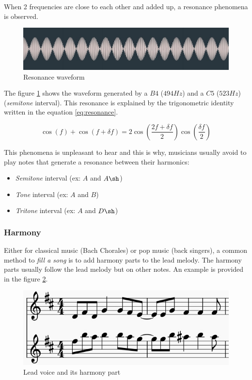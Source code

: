\documentclass[12pt]{report}
\begin{document}
When 2 frequencies are close to each other and added up, a resonance phenomena is observed.

\begin{figure}[H]
    \centering
    \includegraphics[width=\textwidth]{images/music/waveform/resonance.jpg}
    \caption{Resonance waveform}
    \label{fig:resonance}
\end{figure}
The figure \ref{fig:resonance} shows the waveform generated by a $B4$ ($494Hz$) and a $C5$ ($523Hz$) (\textit{semitone} interval).
This resonance is explained by the trigonometric identity written in the equation \ref{eq:resonance}.

\begin{equation}
    \cos(f) + \cos(f + \delta f) = 2 \cos(\frac{2f + \delta f}{2}) \cos(\frac{\delta f}{2})
    \label{eq:resonance}
\end{equation}

This phenomena is unpleasant to hear and this is why, musicians usually avoid to play notes that generate a resonance between their harmonics:
\begin{itemize}
    \item \textit{Semitone} interval (ex: $A$ and $A\sh$)
    \item \textit{Tone} interval (ex: $A$ and $B$)
    \item \textit{Tritone} interval (ex: $A$ and $D\sh$)
\end{itemize}


\subsubsection{Harmony}

Either for classical music (Bach Chorales) or pop music (back singers), a common method to \textit{fill a song} is to add harmony parts to the lead melody. The harmony parts usually follow the lead melody but on other notes.
An example is provided in the figure \ref{fig:harmony_example}.

\begin{figure}[H]
    \centering
    \includegraphics[width=0.75 \textwidth]{images/music/stave/harmony.jpg}
    \caption{Lead voice and its harmony part}
    \label{fig:harmony_example}
\end{figure}
\end{document}
